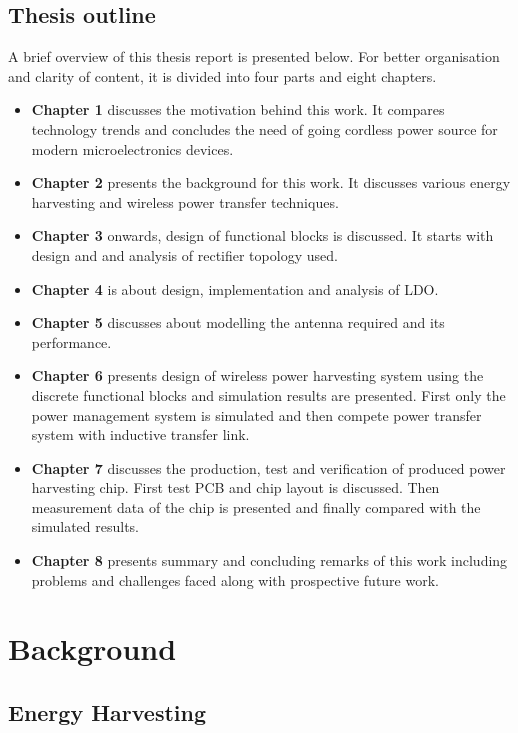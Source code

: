 \documentclass[12pt,a4paper,UKenglish]{report}
\begin{document}
\section{Thesis outline}

A brief overview of this thesis report is presented below. For better organisation and clarity of content, it is divided into four parts 
and eight chapters. 
\begin{itemize}
\item \textbf{Chapter 1} discusses the motivation behind this work. It compares technology trends and concludes
the need of going cordless power source for modern microelectronics devices.
\item \textbf{Chapter 2} presents the background for this work. It discusses various energy harvesting and 
wireless power transfer techniques.
\item \textbf{Chapter 3} onwards, design of functional blocks is discussed. It starts with design and 
and analysis of rectifier topology used.
\item \textbf{Chapter 4} is about design, implementation and analysis of LDO.
\item \textbf{Chapter 5} discusses about modelling the antenna required and its performance. 
\item \textbf{Chapter 6} presents design of wireless power harvesting system using the discrete functional blocks and simulation 
results are presented. First only the power management system is simulated and then compete power transfer system with 
inductive transfer link.
\item \textbf{Chapter 7} discusses the production, test and verification of produced power harvesting chip. First test PCB and 
chip layout is discussed. Then measurement data of the chip is presented and finally compared with the simulated results.
\item \textbf{Chapter 8} presents summary and concluding remarks of this work including problems and challenges faced 
along with prospective future work.

\end{itemize}




\chapter{Background}

\section{Energy Harvesting}
\end{document}
